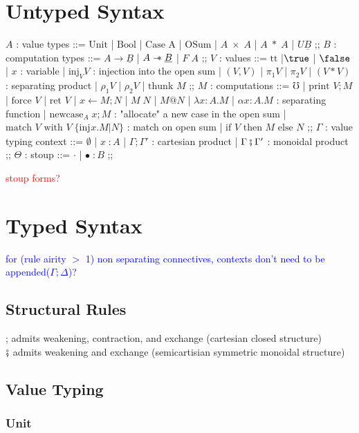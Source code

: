 \documentclass{article}
\makeatletter
\newcommand{\blue}[1]{\textcolor{blue}{#1}}
\newcommand{\red}[1]{\textcolor{red}{#1}}
\newcommand\sep{\mathrel{-\mkern-6mu*}}
\newcommand{\thunk}[1]{\textrm{thunk }#1}
\newcommand{\injj}[2]{\textrm{inj}_{#1}#2}
\newcommand{\err}{\mho}
\newcommand{\print}[1]{\textrm{print }#1}
\newcommand{\force}[1]{\textrm{force }#1}
\newcommand{\ret}[1]{\textrm{ret }#1}
\newcommand{\bind}[3]{#1 \leftarrow #2 ; #3}
\newcommand{\newcase}[3]{\textrm{newcase}_{#1} \; #2 ; #3}
\newcommand{\match}[5]{\textrm{match }#1 \textrm{ with }#2 \;\{#3 . #4 | #5\}}
\newcommand{\lett}[4]{\textrm{let }(#1,#2) = #3 ; #4}
\newcommand{\lets}[4]{\textrm{let }(#1*#2) = #3 ; #4}
\newcommand{\ite}[3]{\textrm{if }#1 \textrm{ then }#2 \textrm{ else }#3}
\newcommand{\at}{\textrm{@}}
\newcommand{\ttt}{\textrm{tt}}
\makeatother
\begin{document}
\section{Untyped Syntax}
\begin{bnfgrammar}
$A$ : value types ::= $\textrm{Unit}$
| $\textrm{Bool}$
| $\textrm{Case A}$ 
| $\textrm{OSum}$
| $A\; \times \; A$  
| $A\; * \; A$
| $U\underline{B}$
;;
$B$ : computation types ::= $A \rightarrow \underline{B}$ 
| $A \sep \underline{B}$
| $F\;A$
;;
$V$ : values ::= $\ttt$
|$\true$
| $\false$
| $x$ : variable
| $\injj{V}{V}$ : injection into the open sum
| $(V,V)$
| $\pi_1 V$
| $\pi_2 V$
| $(V*V)$ : separating product
| $\rho_1 V$
| $\rho_2 V$
| $\thunk{M}$
;;
$M$ : computations ::= $\err$
| $\print{V} ; M$
| $\force{V}$
| $\ret{V}$
| $\bind{x}{M}{N}$
| $M \; N$
| $M \at N$
| $\lambda x \colon A . M$
| $\alpha x \colon A . M$ : separating function
| $\newcase{A}{x}{M}$ : "allocate" a new case in the open sum
| $\match{V}{V}{\injj{}{x}}{M}{N}$ : match on open sum
| $\ite{V}{M}{N}$
;;
$\Gamma$ : value typing context ::= $\emptyset$ 
| $ x \; \colon A$
| $\Gamma ; \Gamma'$ : cartesian product
| $\Gamma \fatsemi \Gamma'$ : monoidal product
;;
$\Theta$ : stoup ::= $\cdot$ 
| $\bullet \; \colon B$
;;
\end{bnfgrammar}
\red{stoup forms?}
\begin{comment}
    | $\lett{x}{y}{V}{M}$
| $\lets{x}{y}{V}{M}$
\end{comment}

\newpage
\section{Typed Syntax}
\blue{for (rule airity $>$ 1) non separating connectives, contexts don't need to be appended($\Gamma ; \Delta$)?}
\subsection{Structural Rules}
; admits weakening, contraction, and exchange (cartesian closed structure)\\
$\fatsemi$ admits weakening and exchange (semicartisian symmetric monoidal structure)
\subsection{Value Typing}
\subsubsection{Unit}
\end{document}

